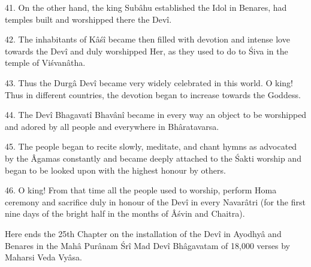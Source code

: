 41. On the other hand, the king Sub\^ahu established the Idol in Benares, had temples built and worshipped there the Dev\^i.

42. The inhabitants of K\^a\'s\^i became then filled with devotion and intense love towards the Dev\^i and duly worshipped Her, as they used to do to \'Siva in the temple of Vi\'svan\^atha.

43. Thus the Durg\^a Dev\^i became very widely celebrated in this world. O king! Thus in different countries, the devotion began to increase towards the Goddess.

44. The Dev\^i Bhagavat\^i Bhav\^an\^i became in every way an object to be worshipped and adored by all people and everywhere in Bh\^aratavarsa.

45. The people began to recite slowly, meditate, and chant hymns as advocated by the Âgamas constantly and became deeply attached to the \'Sakti worship and began to be looked upon with the highest honour by others.

46. O king! From that time all the people used to worship, perform Homa ceremony and sacrifice duly in honour of the Dev\^i in every Navar\^atri (for the first nine days of the bright half in the months of Â\'svin and Chaitra).

Here ends the 25th Chapter on the installation of the Dev\^i in Ayodhy\^a and Benares in the Mah\^a Pur\^anam \'Sr\^i Mad Dev\^i Bh\^agavatam of 18,000 verses by Maharsi Veda Vy\^asa.